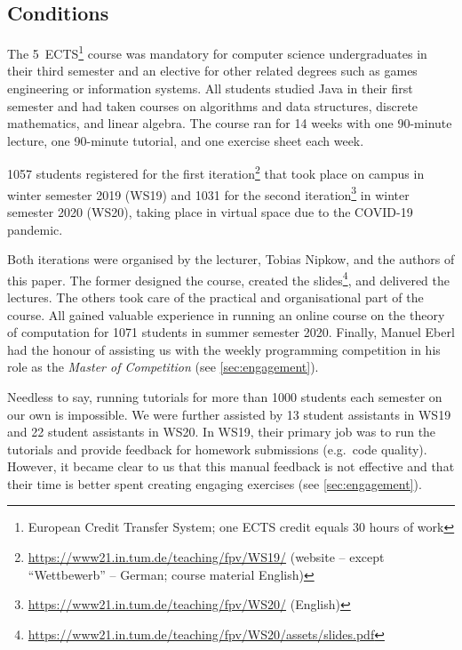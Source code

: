 \subsection{Conditions}

The 5~ECTS\footnote{European Credit Transfer System; one ECTS credit equals 30 hours of work} course was mandatory for computer science undergraduates in their third semester and
an elective for other related degrees such as games engineering or information systems.
All students studied Java in their first semester and had taken courses on algorithms and data structures,
discrete mathematics, and linear algebra.
The course ran for 14 weeks with
one 90-minute lecture,
one 90-minute tutorial,
and one exercise sheet each week.

1057 students registered for
the first iteration\footnote{\url{https://www21.in.tum.de/teaching/fpv/WS19/} (website -- except ``Wettbewerb'' -- German; course material English)} that took place on campus in winter semester 2019 (WS19) and
1031 for the second iteration\footnote{\url{https://www21.in.tum.de/teaching/fpv/WS20/} (English)} in winter semester 2020 (WS20), taking place in virtual space due to the COVID-19 pandemic.

Both iterations were organised by the lecturer, Tobias Nipkow, and the authors of this paper.
The former designed the course, created the slides\footnote{\url{https://www21.in.tum.de/teaching/fpv/WS20/assets/slides.pdf}}, and delivered the lectures.
The others took care of the practical and organisational part of the course.
All gained valuable experience in running an online course on the theory of computation for 1071
students in summer semester 2020.
Finally, Manuel Eberl had the honour of assisting us with the weekly programming competition in his role as the \emph{Master of Competition} (see \cref{sec:engagement}).

Needless to say,
running tutorials for more than 1000
students each semester on our own is impossible.
We were further assisted by
13 student assistants in WS19 and
22 student assistants in WS20.
In WS19, their primary job was to run the tutorials and provide feedback for homework submissions (e.g.\ code quality).
However, it became clear to us
that this manual feedback is not effective
and that their time is better spent creating engaging exercises (see \cref{sec:engagement}).



